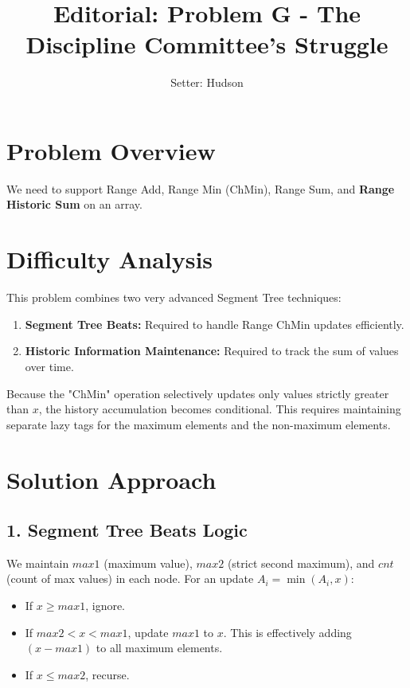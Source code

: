 \documentclass[11pt]{article}
\title{\textbf{Editorial: Problem G - The Discipline Committee's Struggle}}
\author{Setter: Hudson}
\date{}
\begin{document}
\maketitle

\section*{Problem Overview}
We need to support Range Add, Range Min (ChMin), Range Sum, and \textbf{Range Historic Sum} on an array.

\section*{Difficulty Analysis}
This problem combines two very advanced Segment Tree techniques:
\begin{enumerate}
    \item \textbf{Segment Tree Beats:} Required to handle Range ChMin updates efficiently.
    \item \textbf{Historic Information Maintenance:} Required to track the sum of values over time. 
\end{enumerate}
Because the "ChMin" operation selectively updates only values strictly greater than $x$, the history accumulation becomes conditional. This requires maintaining separate lazy tags for the maximum elements and the non-maximum elements.

\section*{Solution Approach}

\subsection*{1. Segment Tree Beats Logic}
We maintain $max1$ (maximum value), $max2$ (strict second maximum), and $cnt$ (count of max values) in each node.
For an update $A_i = \min(A_i, x)$:
\begin{itemize}
    \item If $x \ge max1$, ignore.
    \item If $max2 < x < max1$, update $max1$ to $x$. This is effectively adding $(x - max1)$ to all maximum elements.
    \item If $x \le max2$, recurse.
\end{itemize}
\end{document}
